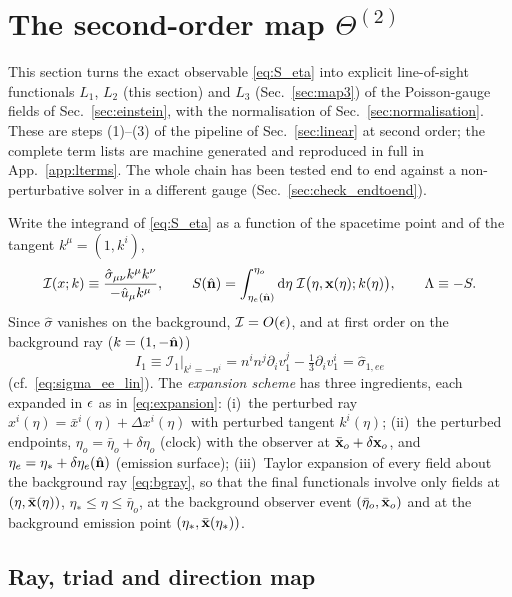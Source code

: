 \section{The second-order map \texorpdfstring{$\Theta^{(2)}$}{Theta2}}
\label{sec:map2}
This section turns the exact observable \eqref{eq:S_eta} into explicit line-of-sight functionals $L_1$, $L_2$
(this section) and $L_3$ (Sec.~\ref{sec:map3}) of the Poisson-gauge fields of Sec.~\ref{sec:einstein}, with the
normalisation of Sec.~\ref{sec:normalisation}.  These are steps (1)--(3) of the pipeline of Sec.~\ref{sec:linear} at second
order; the complete term lists are machine generated and reproduced in full in App.~\ref{app:lterms}.  The whole chain has been tested
end to end against a non-perturbative solver in a different gauge (Sec.~\ref{sec:check_endtoend}).

Write the integrand of \eqref{eq:S_eta} as a function of the spacetime point and of the tangent $k^\mu=(1,k^i)$,
\begin{equation}
\mathcal I(x;k)\equiv\frac{\hat\sigma_{\mu\nu}k^\mu k^\nu}{-\hat u_\mu k^\mu},\qquad
S(\hat{\mathbf n})=\int_{\eta_e(\hat{\mathbf n})}^{\eta_o}\mathrm d\eta\;\mathcal I\big(\eta,\mathbf x(\eta);k(\eta)\big),\qquad \Lambda\equiv-S .
\label{eq:Idef}
\end{equation}
Since $\hat\sigma$ vanishes on the background, $\mathcal I=O(\epsilon)$, and at first order on the background ray ($k=(1,-\hat{\mathbf n})$)
\begin{equation}
I_1\equiv\mathcal I_1\big|_{k^i=-n^i}=n^in^j\partial_iv^j_1-\tfrac13\partial_iv^i_1=\hat\sigma_{1,ee}
\label{eq:I1}
\end{equation}
(cf.\ \eqref{eq:sigma_ee_lin}).  The \emph{expansion scheme} has three ingredients, each expanded in $\epsilon$ as in
\eqref{eq:expansion}: (i)~the perturbed ray $x^i(\eta)=\bar x^i(\eta)+\Delta x^i(\eta)$ with perturbed tangent $k^i(\eta)$;
(ii)~the perturbed endpoints, $\eta_o=\bar\eta_o+\delta\eta_o$ (clock) with the observer at $\bar{\mathbf x}_o+\delta\mathbf x_o$, and
$\eta_e=\eta_*+\delta\eta_e(\hat{\mathbf n})$ (emission surface); (iii)~Taylor expansion of every field about the background ray
\eqref{eq:bgray}, so that the final functionals involve only fields at $(\eta,\bar{\mathbf x}(\eta))$, $\eta_*\le\eta\le\bar\eta_o$,
at the background observer event $(\bar\eta_o,\bar{\mathbf x}_o)$ and at the background emission point $(\eta_*,\bar{\mathbf x}(\eta_*))$.

\subsection{Ray, triad and direction map}
\label{sec:ray}
